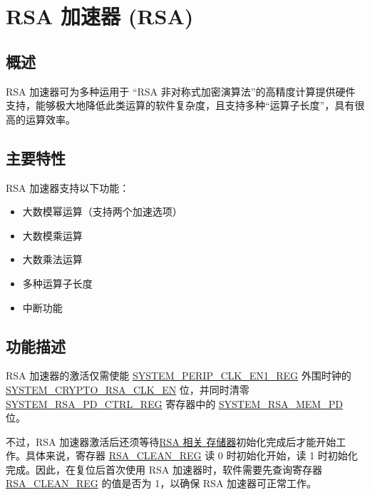 \documentclass[main\_\_CN.tex]{subfiles}
\begin{document}

\ifglobal
\else
    {\let\clearpage\relax \listoftodos}
    \tableofcontents
\fi



\hypertarget{rsa}{}
\chapter{RSA 加速器 (RSA)}\label{mod:rsa}

\section{概述}

RSA 加速器可为多种运用于 “RSA 非对称式加密演算法”的高精度计算提供硬件支持，能够极大地降低此类运算的软件复杂度，且支持多种“运算子长度”，具有很高的运算效率。

\section{主要特性}

RSA 加速器支持以下功能：
\begin{itemize}
    \item 大数模幂运算（支持两个加速选项） 
    \item 大数模乘运算 
    \item 大数乘法运算 
    \item 多种运算子长度
    \item 中断功能
\end{itemize}


\section{功能描述}

RSA 加速器的激活仅需使能 \hyperref[regdesc:SYSTEMPERIPCLKEN1REG]{SYSTEM\_PERIP\_CLK\_EN1\_REG} 外围时钟的 \hyperref[fielddesc:SYSTEMCRYPTORSACLKEN]{SYSTEM\_CRYPTO\_RSA\_CLK\_EN} 位，并同时清零 \hyperref[regdesc:SYSTEMRSAPDCTRLREG]{SYSTEM\_RSA\_PD\_CTRL\_REG} 寄存器中的 \hyperref[fielddesc:SYSTEMRSAMEMPD]{SYSTEM\_RSA\_MEM\_PD} 位。

不过，RSA 加速器激活后还须等待\hyperref[sec:mem-sum]{RSA 相关 存储器}初始化完成后才能开始工作。具体来说，寄存器 \hyperref[regdesc:RSACLEANREG]{RSA\_CLEAN\_REG} 读 0 时初始化开始，读 1 时初始化完成。因此，在复位后首次使用 RSA 加速器时，软件需要先查询寄存器 \hyperref[regdesc:RSACLEANREG]{RSA\_CLEAN\_REG} 的值是否为 1，以确保 RSA 加速器可正常工作。
\end{document}
